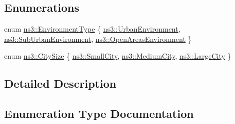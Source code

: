 \subsection*{Enumerations}
\begin{DoxyCompactItemize}
\item 
enum \hyperlink{group__propagation_ga0e392ed771a28c92112047e63308a53a}{ns3\+::\+Environment\+Type} \{ \hyperlink{group__propagation_gga0e392ed771a28c92112047e63308a53aad575d1b07ccac0218783bbd0f523784c}{ns3\+::\+Urban\+Environment}, 
\hyperlink{group__propagation_gga0e392ed771a28c92112047e63308a53aa06cbfe108cde1eb2070702b2ed4fb189}{ns3\+::\+Sub\+Urban\+Environment}, 
\hyperlink{group__propagation_gga0e392ed771a28c92112047e63308a53aa51f78effebc3753d7cd2ee9b5924c028}{ns3\+::\+Open\+Areas\+Environment}
 \}
\item 
enum \hyperlink{group__propagation_ga29c9a1b1a58b6a56054ff5ea4c5a574d}{ns3\+::\+City\+Size} \{ \hyperlink{group__propagation_gga29c9a1b1a58b6a56054ff5ea4c5a574dad3f856f2f166ae12798befabfbd2c99e}{ns3\+::\+Small\+City}, 
\hyperlink{group__propagation_gga29c9a1b1a58b6a56054ff5ea4c5a574dad922b499b70e978a03d2230093e4aacd}{ns3\+::\+Medium\+City}, 
\hyperlink{group__propagation_gga29c9a1b1a58b6a56054ff5ea4c5a574da017d6be2af0a102a6147e6519d63f54c}{ns3\+::\+Large\+City}
 \}
\end{DoxyCompactItemize}


\subsection{Detailed Description}


\subsection{Enumeration Type Documentation}
